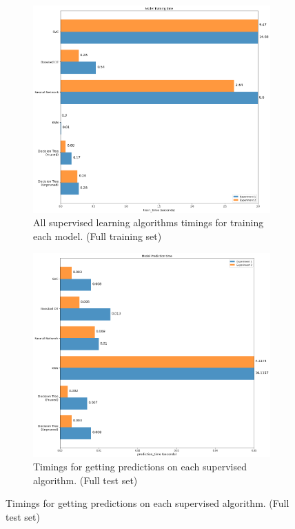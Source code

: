\documentclass[
	letterpaper, %
]{IEEEtran}
\begin{document}
	\begin{figure}[h]
		\begin{subfigure}{.5\textwidth}
			\centering
			\includegraphics[width=.8\linewidth]{./images/allModelsTrainingTime.png}
			\caption{All supervised learning algorithms timings for training each model. (Full training set)}
			\label{fig:allAgsTrainTime}
		\end{subfigure}
		\begin{subfigure}{.5\textwidth}
			\centering
			\includegraphics[width=.8\linewidth]{./images/allModelsTestTime.png}
			\caption{Timings for getting predictions on each supervised algorithm. (Full test set)}
			\label{fig:allAgsTestTime}
		\end{subfigure}
	\end{figure}
\end{document}
